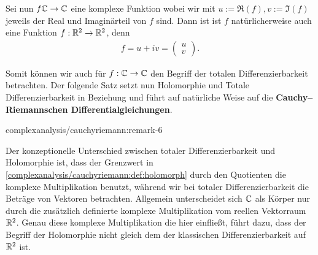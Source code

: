 \par
Sei nun \(f\mathbb{C}\to\mathbb{C}\) eine komplexe Funktion wobei wir mit \(u:=\Re(f),v:=\Im(f)\) jeweils der Real  und Imaginärteil von \(f\) sind. Dann ist ist \(f\) natürlicherweise auch eine Funktion \(f:\mathbb{R}^2\to\mathbb{R}^2\), denn
\begin{align*}
f = u+iv = \begin{pmatrix} u\\ v\end{pmatrix}.
\end{align*}
\par
Somit können wir auch für \(f:\mathbb{C}\to\mathbb{C}\) den Begriff der totalen Differenzierbarkeit betrachten. Der folgende Satz setzt nun Holomorphie und Totale Differenzierbarkeit in Beziehung und führt auf natürliche Weise auf die \textbf{Cauchy–Riemannschen Differentialgleichungen}.
\begin{remark}{}{complexanalysis/cauchyriemann:remark-6}



\par
Der konzeptionelle Unterschied zwischen totaler Differenzierbarkeit und Holomorphie ist, dass der Grenzwert in \cref{complexanalysis/cauchyriemann:def:holomorph} durch den Quotienten die komplexe Multiplikation benutzt, während wir bei totaler Differenzierbarkeit die Beträge von Vektoren betrachten. Allgemein unterscheidet sich \(\mathbb{C}\) als Körper nur durch die zusätzlich definierte komplexe Multiplikation vom reellen Vektorraum \(\mathbb{R}^2\). Genau diese komplexe Multiplikation die hier einfließt, führt dazu, dass der Begriff der Holomorphie nicht gleich dem der klassischen Differenzierbarkeit auf \(\mathbb{R}^2\) ist.
\end{remark}


